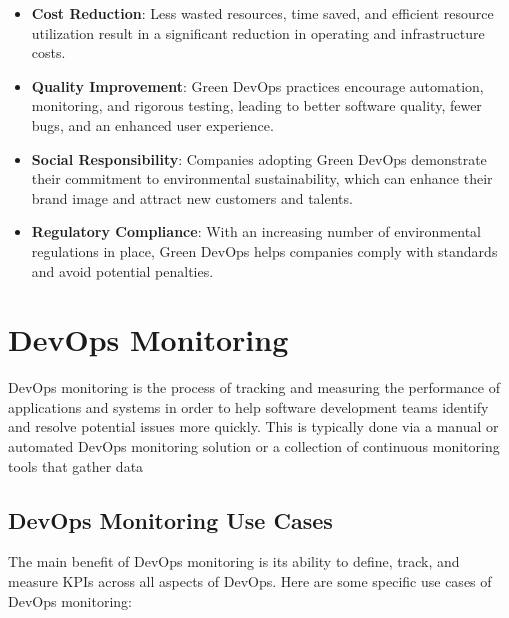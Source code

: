 \begin{itemize}
  \item \textbf{Cost Reduction}: Less wasted resources, time saved, and efficient resource utilization result in a significant reduction in operating and infrastructure costs.
  
  \item \textbf{Quality Improvement}: Green DevOps practices encourage automation, monitoring, and rigorous testing, leading to better software quality, fewer bugs, and an enhanced user experience.
  
  \item \textbf{Social Responsibility}: Companies adopting Green DevOps demonstrate their commitment to environmental sustainability, which can enhance their brand image and attract new customers and talents.
  
  \item \textbf{Regulatory Compliance}: With an increasing number of environmental regulations in place, Green DevOps helps companies comply with standards and avoid potential penalties.
\end{itemize}

\section{DevOps Monitoring}
DevOps monitoring is the process of tracking and measuring the performance of applications and systems in order to help software development teams identify and resolve potential issues more quickly. This is typically done via a manual or automated DevOps monitoring solution or a collection of continuous monitoring tools that gather data

\subsection{DevOps Monitoring Use Cases}

The main benefit of DevOps monitoring is its ability to define, track, and measure KPIs across all aspects of DevOps. Here are some specific use cases of DevOps monitoring:

